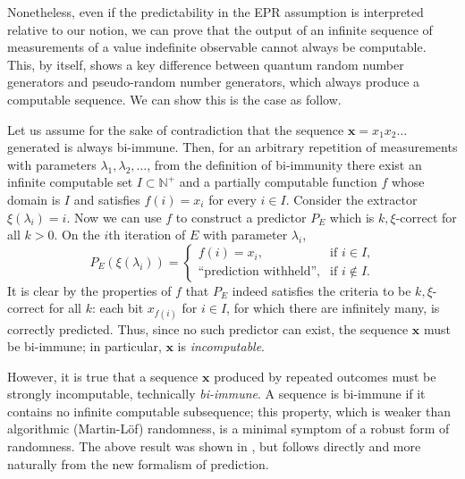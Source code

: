 \documentclass[%
 superscriptaddress,
 preprint,
 showpacs,
 showkeys,
 preprintnumbers,
 nofootinbib,
  amsmath,amssymb,
  aps,
 pra,
  longbibliography,
  floatfix,
 ]{revtex4-1}
\theoremstyle{definition}
\newcommand{\N}{\mathbb{N}}%
\newcommand{\x}{\mathbf{x}}
\begin{document}

Nonetheless, even if the predictability in the EPR assumption is interpreted relative to our notion, we can prove that the output of an infinite sequence of measurements of a value indefinite observable cannot always be computable.
This, by itself, shows a key difference between quantum random number generators and pseudo-random number generators, which always produce a computable sequence.
We can show this is the case as follow.

Let us assume for the sake of contradiction that the sequence $\x=x_1x_2\dots$ generated is always bi-immune.
Then, for an arbitrary repetition of measurements with parameters $\lambda_1,\lambda_2,\dots$, from the definition of bi-immunity there exist an infinite computable set $I \subset \N^+$ and a partially computable function $f$ whose domain is $I$ and satisfies $f(i)=x_i$ for every $i\in I$.
Consider the extractor $\xi(\lambda_i) = i$.
Now we can use $f$ to construct a predictor $P_E$ which is $k,\xi$-correct for all $k>0$. 
On the $i$th iteration of $E$ with parameter $\lambda_i$, $$P_E(\xi(\lambda_i))=\begin{cases}f(i)=x_i, & \text{if $i\in I$,}\\\text{``{prediction withheld}'',} & \text{if $i\notin I$.}\end{cases}$$
It is clear by the properties of $f$ that $P_E$ indeed satisfies the criteria to be $k,\xi$-correct for all $k$:
each bit $x_{f(i)}$ for $i\in I$, for which there are infinitely many, is correctly predicted.
Thus, since no such predictor can exist, the sequence $\x$ must be bi-immune; in particular,   $\x$ is \emph{incomputable}.
\fi

However, it is true that a sequence $\x$ produced by repeated outcomes must be strongly incomputable, technically \emph{bi-immune}. A  sequence is bi-immune if it contains no infinite computable subsequence; this property, which is weaker than algorithmic (Martin-L\"of) randomness, is a minimal symptom of a robust form of randomness.
The above result was shown in \cite{svozil-2006-ran,2012-incomput-proofsCJ}, but follows directly and more naturally from the new formalism of prediction.
\end{document}
